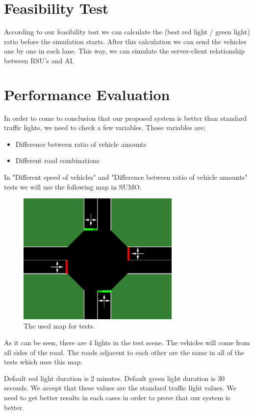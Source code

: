\documentclass[conference]{IEEEtran}
\begin{document}
\section{Feasibility Test}
According to our feasibility test we can calculate the (best red light / green light) ratio before the simulation starts. After this calculation we can send the vehicles one by one in each lane. This way, we can simulate the server-client relationship between RSU's and AI. 

\section{Performance Evaluation}

In order to come to conclusion that our proposed system is better than standard traffic lights, we need to check a few variables. Those variables are:
\begin{itemize}
	\item Difference between ratio of vehicle amounts
	\item Different road combinations
\end{itemize}

In "Different speed of vehicles" and "Difference between ratio of vehicle amounts" tests we will use the following map in SUMO.

 \begin{figure}[h!]
     \centering
     \includegraphics[width=8cm]{testcase_1.jpg}
     \caption{The used map for tests.}
     \label{fig:my_label}
 \end{figure} 


As it can be seen, there are 4 lights in the test scene. The vehicles will come from all sides of the road. The roads adjacent to each other are the same in all of the tests which uses this map.

Default red light duration is 2 minutes. Default green light duration is 30 seconds. We accept that these values are the standard traffic light values. We need to get better results in each cases in order to prove that our system is better.
\end{document}
